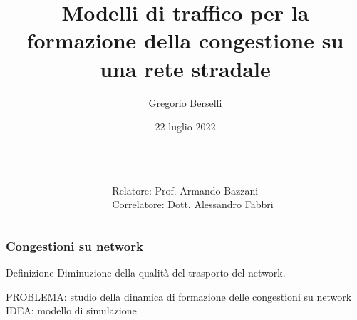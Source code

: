 \documentclass[
	11pt, %
]{beamer}
\title[]{Modelli di traffico per la formazione della congestione su una rete stradale} %
\author[Gregorio Berselli]{Gregorio Berselli} %
\institute[UniBO]{Laurea in Fisica \\ \smallskip Universit\`a di Bologna} %
\date[22 luglio 2022]{22 luglio 2022} %
\begin{document}

\begin{frame}
	\titlepage %
	\begin{columns}[c]
		\begin{column}{0.55\textwidth}
			
		\end{column}
		\begin{column}{0.45\textwidth}
			\raggedleft
			\scriptsize
			Relatore: Prof. Armando Bazzani \\ \smallskip
			Correlatore: Dott. Alessandro Fabbri
		\end{column}
	\end{columns}
\end{frame}


\begin{frame}
	\frametitle{Congestioni su network}
	\begin{block}{Definizione}
		Diminuzione della qualit\`a del trasporto del network.
	\end{block}
	\vspace{10mm}
	PROBLEMA: studio della dinamica di formazione delle congestioni su network\\ \smallskip
	IDEA: modello di simulazione
\end{frame}
\end{document}
